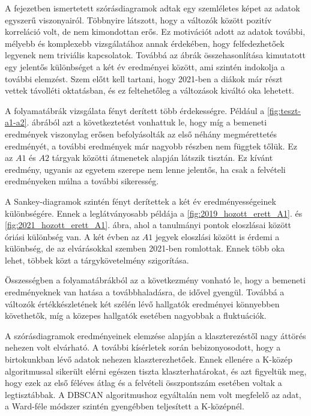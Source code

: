 \documentclass[12pt]{article}
\begin{document}
A fejezetben ismertetett szórásdiagramok adtak egy szemléletes képet az adatok egyszerű viszonyairól. Többnyire látszott, hogy a változók között pozitív korreláció volt, de nem kimondottan erős. Ez motivációt adott az adatok további, mélyebb és komplexebb vizsgálatához annak érdekében, hogy felfedezhetőek legyenek nem triviális kapcsolatok. Továbbá az ábrák összehasonlítása kimutatott egy jelentős különbséget a két év eredményei között, ami szintén indokolja a további elemzést. Szem előtt kell tartani, hogy 2021-ben a diákok már részt vettek távolléti oktatásban, és ez feltehetőleg a változások kiváltó oka lehetett.

A folyamatábrák vizsgálata fényt derített több érdekességre. Például a \ref{fig:teszt-a1-a2}. ábrából azt a következtetést vonhattuk le, hogy míg a bemeneti eredmények viszonylag erősen befolyásolták az első néhány megmérettetés eredményét, a további eredmények már nagyobb részben nem függtek tőlük. Ez az $A1$ és $A2$ tárgyak közötti átmenetek alapján látszik tisztán. Ez kívánt eredmény, ugyanis az egyetem szerepe nem lenne jelentős, ha csak a felvételi eredményeken múlna a további sikeresség.

A Sankey-diagramok szintén fényt derítettek a két év eredményességeinek különbségére. Ennek a leglátványosabb példája a \ref{fig:2019_hozott_erett_A1}. és \ref{fig:2021_hozott_erett_A1}. ábra, ahol a tanulmányi pontok eloszlásai között óriási különbség van. A két évben az $A1$ jegyek eloszlási között is érdemi a különbség, de az elvárásokkal szemben 2021-ben romlottak. Ennek több oka lehet, többek közt a tárgykövetelmény szigorítása.

Összességben a folyamatábrákból az a következmény vonható le, hogy a bemeneti eredményeknek van hatása a továbbhaladásra, de idővel gyengül. Továbbá a változók értékkészletének két szélén lévő hallgatók eredményei könnyebben követhetők, míg a közepes hallgatók esetében nagyobbak a fluktuációk.

A szórásdiagramok eredményeinek elemzése alapján a klaszterezéstől nagy áttörés nehezen volt elvárható. A további kísérletek során bebizonyosodott, hogy a birtokunkban lévő adatok nehezen klaszterezhetőek. Ennek ellenére a K-közép algoritmussal sikerült elérni egészen tiszta klaszterhatárokat, és azt figyeltük meg, hogy ezek az első féléves átlag és a felvételi összpontszám esetében voltak a legtisztábbak. A DBSCAN algoritmushoz egyáltalán nem volt megfelelő az adat, a Ward-féle módszer szintén gyengébben teljesített a K-középnél.
\end{document}
